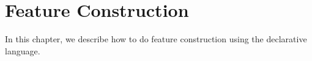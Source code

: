 \chapter{Feature Construction}
\label{featureconstruction}

In this chapter, we describe how to do feature construction using the
declarative language.
